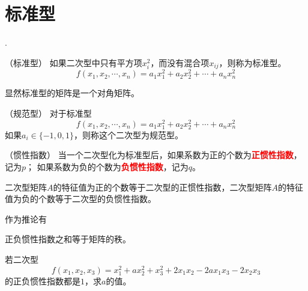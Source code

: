\section{标准型}
.
\begin{definition}
    （标准型）
    如果二次型中只有平方项$x_i^2$，而没有混合项$x_{ij}$，则称为标准型。
    \[ f(x_1,x_2,\cdots,x_n) = a_1x_1^2 + a_2x_2^2 + \cdots + a_nx_n^2 \]
\end{definition}
显然标准型的矩阵是一个对角矩阵。

\begin{definition}
    （规范型）
    对于标准型
    \[ f(x_1,x_2,\cdots,x_n) = a_1x_1^2 + a_2x_2^2 + \cdots + a_nx_n^2 \]
    如果$a_i \in \{-1,0,1\}$，则称这个二次型为规范型。
\end{definition}

\begin{definition}
    （惯性指数）
    当一个二次型化为标准型后，如果系数为正的个数为\textcolor{red}{\textbf{\textsf{正惯性指数}}}，记为$p$；
    如果系数为负的个数为\textcolor{red}{\textbf{\textsf{负惯性指数}}}，记为$q$。
\end{definition}
\begin{theorem}
    二次型矩阵$A$的特征值为正的个数等于二次型的正惯性指数，二次型矩阵$A$的特征值为负的个数等于二次型的负惯性指数。
\end{theorem}
作为推论有
\begin{theorem}
    正负惯性指数之和等于矩阵的秩。
\end{theorem}
\begin{example}
    若二次型
    \[ f(x_1,x_2,x_3) = x_1^2 + ax_2^2 + x_3^2 + 2x_1x_2 - 2ax_1x_3 - 2x_2x_3 \]
    的正负惯性指数都是$1$，求$a$的值。
\end{example}
